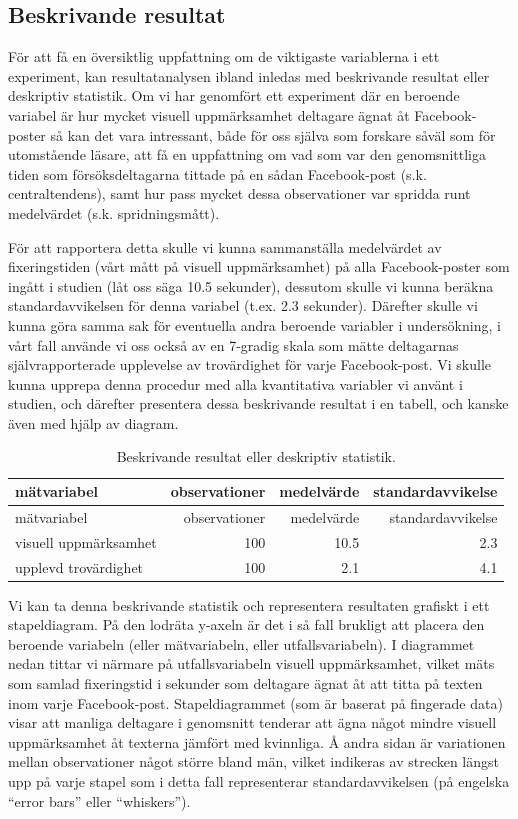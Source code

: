 \documentclass[
]{book}
\begin{document}
\hypertarget{sub08.1.1}{%
\subsection{Beskrivande resultat}\label{sub08.1.1}}

För att få en översiktlig uppfattning om de viktigaste variablerna i ett experiment, kan resultatanalysen ibland inledas med beskrivande resultat eller deskriptiv statistik. Om vi har genomfört ett experiment där en beroende variabel är hur mycket visuell uppmärksamhet deltagare ägnat åt Facebook-poster så kan det vara intressant, både för oss själva som forskare såväl som för utomstående läsare, att få en uppfattning om vad som var den genomsnittliga tiden som försöksdeltagarna tittade på en sådan Facebook-post (s.k. centraltendens), samt hur pass mycket dessa observationer var spridda runt medelvärdet (s.k. spridningsmått).

För att rapportera detta skulle vi kunna sammanställa medelvärdet av fixeringstiden (vårt mått på visuell uppmärksamhet) på alla Facebook-poster som ingått i studien (låt oss säga 10.5 sekunder), dessutom skulle vi kunna beräkna standardavvikelsen för denna variabel (t.ex. 2.3 sekunder). Därefter skulle vi kunna göra samma sak för eventuella andra beroende variabler i undersökning, i vårt fall använde vi oss också av en 7-gradig skala som mätte deltagarnas självrapporterade upplevelse av trovärdighet för varje Facebook-post. Vi skulle kunna upprepa denna procedur med alla kvantitativa variabler vi använt i studien, och därefter presentera dessa beskrivande resultat i en tabell, och kanske även med hjälp av diagram.

\begin{longtable}[]{@{}lrrr@{}}
\caption{\label{tab:tab-02-08-1-1-01}Beskrivande resultat eller deskriptiv statistik.}\tabularnewline
\toprule
mätvariabel & observationer & medelvärde & standardavvikelse\tabularnewline
\midrule
\endfirsthead
\toprule
mätvariabel & observationer & medelvärde & standardavvikelse\tabularnewline
\midrule
\endhead
visuell uppmärksamhet & 100 & 10.5 & 2.3\tabularnewline
upplevd trovärdighet & 100 & 2.1 & 4.1\tabularnewline
\bottomrule
\end{longtable}

Vi kan ta denna beskrivande statistik och representera resultaten grafiskt i ett stapeldiagram. På den lodräta y-axeln är det i så fall brukligt att placera den beroende variabeln (eller mätvariabeln, eller utfallsvariabeln). I diagrammet nedan tittar vi närmare på utfallsvariabeln visuell uppmärksamhet, vilket mäts som samlad fixeringstid i sekunder som deltagare ägnat åt att titta på texten inom varje Facebook-post. Stapeldiagrammet (som är baserat på fingerade data) visar att manliga deltagare i genomsnitt tenderar att ägna något mindre visuell uppmärksamhet åt texterna jämfört med kvinnliga. Å andra sidan är variationen mellan observationer något större bland män, vilket indikeras av strecken längst upp på varje stapel som i detta fall representerar standardavvikelsen (på engelska ``error bars'' eller ``whiskers'').
\end{document}
